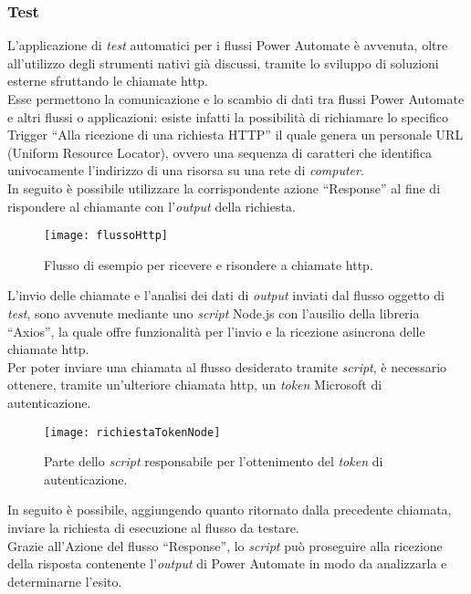 \subsubsection*{Test}
\label{testProgrammazione}
L'applicazione di \emph{test} automatici per i flussi Power Automate è avvenuta, oltre all'utilizzo degli strumenti nativi già discussi, tramite lo sviluppo di soluzioni esterne sfruttando le chiamate \gls{http}.\\
Esse permettono la comunicazione e lo scambio di dati tra flussi Power Automate e altri flussi o applicazioni: esiste infatti la possibilità di richiamare lo specifico Trigger “Alla ricezione di una richiesta HTTP” il quale genera un personale URL (Uniform Resource Locator), ovvero una sequenza di caratteri che identifica univocamente l'indirizzo di una risorsa su una rete di \emph{computer}.\\
In seguito è possibile utilizzare la corrispondente azione “Response” al fine di rispondere al chiamante con l'\emph{output} della richiesta.\\
\begin{figure}[htbp] 
    \centering 
    \texttt{[image: flussoHttp]} 
    \caption{Flusso di esempio per ricevere e risondere a chiamate \gls{http}.}
    \label{fig:flussoHttp}
\end{figure}
\newline L'invio delle chiamate e l'analisi dei dati di \emph{output} inviati dal flusso oggetto di \emph{test}, sono avvenute mediante uno \emph{script} Node.js con l'ausilio della libreria “Axios”, la quale offre funzionalità per l'invio e la ricezione asincrona delle chiamate \gls{http}.\\
Per poter inviare una chiamata al flusso desiderato tramite \emph{script}, è necessario ottenere, tramite un'ulteriore chiamata \gls{http}, un \emph{token} Microsoft di autenticazione.
\begin{figure}[htbp] 
    \centering 
    \texttt{[image: richiestaTokenNode]} 
    \caption{Parte dello \emph{script} responsabile per l'ottenimento del \emph{token} di autenticazione.}
    \label{fig:richiestaTokenNode}
\end{figure}
In seguito è possibile, aggiungendo quanto ritornato dalla precedente chiamata, inviare la richiesta di esecuzione al flusso da testare.\\
Grazie all'Azione del flusso “Response”, lo \emph{script} può proseguire alla ricezione della risposta contenente l'\emph{output} di Power Automate in modo da analizzarla e determinarne l'esito.
